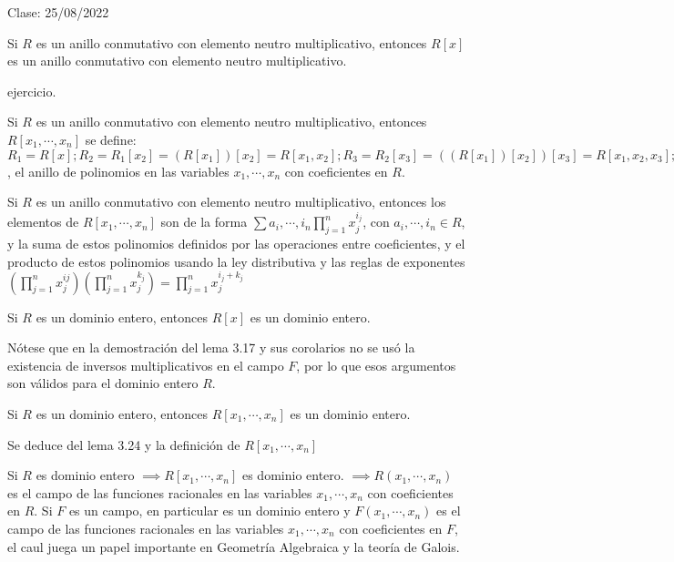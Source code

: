 Clase: 25/08/2022

\begin{prop}
    Si $R$ es un anillo conmutativo con elemento neutro multiplicativo, entonces $R[x]$ es un anillo conmutativo con elemento neutro multiplicativo. \begin{dem}
        ejercicio. 
    \end{dem}
\end{prop}

\begin{definicion}
    Si $R$ es un anillo conmutativo con elemento neutro multiplicativo, entonces $R[x_1,\cdots,x_n]$ se define: $R_1=R[x];R_2=R_1[x_2]=(R[x_1])[x_2]=R[x_1,x_2];R_3=R_2[x_3]=((R[x_1])[x_2])[x_3]=R[x_1,x_2,x_3];\cdots; R_n=R_{n-1}[x_n]=R[x_1,\cdots, x_{n}]$, el anillo de polinomios en las variables $x_1,\cdots, x_n$ con coeficientes en $R$. 
\end{definicion}

\begin{prop}
    Si $R$ es un anillo conmutativo con elemento neutro multiplicativo, entonces los elementos de $R[x_1,\cdots, x_n]$ son de la forma $\sum a_i,\cdots, i_n \prod_{j=1}^n x_j^{i_j}$, con $a_i,\cdots,i_n\in R$, y la suma de estos polinomios definidos por las operaciones entre coeficientes, y el producto de estos polinomios usando la ley distributiva y las reglas de exponentes $\left(\prod_{j=1}^n x_j^{ij}\right)\left(\prod_{j=1}^n x_j^{k_j}\right)=\prod_{j=1}^n x_j^{i_j+k_j}$
\end{prop}

\begin{lema}
    Si $R$ es un dominio entero, entonces $R[x]$ es un dominio entero. 
    \begin{dem}
        Nótese que en la demostración del lema 3.17 y sus corolarios no se usó la existencia de inversos multiplicativos en el campo $F$, por lo que esos argumentos son válidos para el dominio entero $R$. 
    \end{dem}
\end{lema}

\begin{corolario}
    Si $R$ es un dominio entero, entonces $R[x_1,\cdots,x_n]$ es un dominio entero. 
    \begin{dem}
        Se deduce del lema 3.24 y la definición de $R[x_1,\cdots, x_n]$
    \end{dem}
\end{corolario}

\begin{nota}
    Si $R$ es dominio entero $\implies R[x_1,\cdots, x_n]$ es dominio entero. $\implies R(x_1,\cdots, x_n)$ es el campo de las funciones racionales en las variables $x_1,\cdots,x_n$ con coeficientes en $R$. Si $F$ es un campo, en particular es un dominio entero y $F(x_1,\cdots, x_n)$ es el campo de las funciones racionales en las variables $x_1,\cdots,x_n$ con coeficientes en $F$, el caul juega un papel importante en Geometría Algebraica y la teoría de Galois.  
\end{nota}


